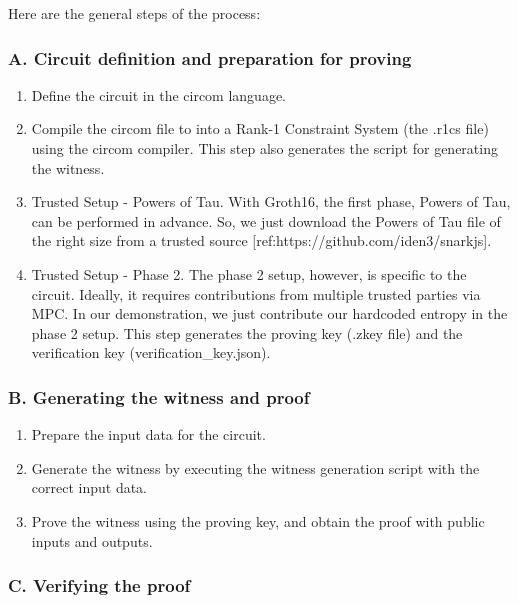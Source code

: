 \documentclass[
]{report}
\providecommand{\tightlist}{%
  \setlength{\itemsep}{0pt}\setlength{\parskip}{0pt}}
\begin{document}
Here are the general steps of the process:

\subsubsection*{A. Circuit definition and preparation for proving}

\begin{enumerate}
\def\labelenumi{\arabic{enumi}.}
\tightlist
\item
  Define the circuit in the circom language.
\item
  Compile the circom file to into a Rank-1 Constraint System (the .r1cs
  file) using the circom compiler. This step also generates the script
  for generating the witness.
\item
  Trusted Setup - Powers of Tau. With Groth16, the first phase, Powers
  of Tau, can be performed in advance. So, we just download the Powers
  of Tau file of the right size from a trusted source
  {[}ref:https://github.com/iden3/snarkjs{]}.
\item
  Trusted Setup - Phase 2. The phase 2 setup, however, is specific to
  the circuit. Ideally, it requires contributions from multiple trusted
  parties via MPC. In our demonstration, we just contribute our
  hardcoded entropy in the phase 2 setup. This step generates the
  proving key (.zkey file) and the verification key
  (verification\_key.json).
\end{enumerate}

\subsubsection*{B. Generating the witness and proof}

\begin{enumerate}
\def\labelenumi{\arabic{enumi}.}
\tightlist
\item
  Prepare the input data for the circuit.
\item
  Generate the witness by executing the witness generation script with
  the correct input data.
\item
  Prove the witness using the proving key, and obtain the proof with
  public inputs and outputs.
\end{enumerate}

\subsubsection*{C. Verifying the proof}
\end{document}
